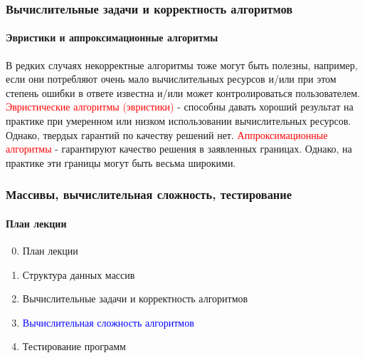 \documentclass[aspectratio=169]{beamer}
\begin{document}
\begin{frame}
\frametitle{Вычислительные задачи и корректность алгоритмов}
\framesubtitle{Эвристики и аппроксимационные алгоритмы}
\justifying
\small
В редких случаях некорректные алгоритмы тоже могут быть полезны, например, если они потребляют очень мало вычислительных ресурсов и/или при этом степень ошибки в ответе известна и/или может контролироваться пользователем.\newline\newline
\textcolor{red}{Эвристические алгоритмы (эвристики)} - способны давать хороший результат на практике при умеренном или низком использовании вычислительных ресурсов. Однако, твердых гарантий по качеству решений нет.\newline\newline
\textcolor{red}{Аппроксимационные алгоритмы} - гарантируют качество решения в заявленных границах. Однако, на практике эти границы могут быть весьма широкими.

\end{frame}

\begin{frame}
\frametitle{Массивы, вычислительная сложность, тестирование}
\framesubtitle{План лекции}

\begin{enumerate}
  \setcounter{enumi}{-1}
  \item{План лекции}
  \item{Структура данных массив}
  \item{Вычислительные задачи и корректность алгоритмов}
  \item{\textcolor{blue}{Вычислительная сложность алгоритмов}}
  \item{Тестирование программ}
\end{enumerate}
\end{frame}
\end{document}
